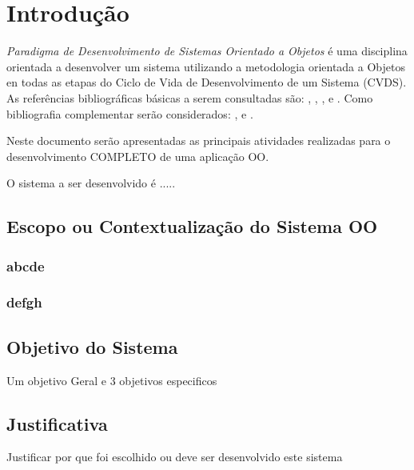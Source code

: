 

\chapter{ Introdu\c{c}\~{a}o}

\textit{Paradigma de Desenvolvimento de Sistemas Orientado a Objetos} \'{e} uma disciplina orientada a desenvolver um sistema utilizando  a metodologia orientada a Objetos en todas as etapas do Ciclo de Vida de Desenvolvimento de um Sistema (CVDS).  As refer\^{e}ncias bibliogr\'{a}ficas b\'{a}sicas a serem consultadas s\~{a}o: \cite{Dennis2014}, \cite{Engholm2013}, \cite{Guedes2011},  \cite{Sommerville2018} e \cite{Wazlawick2011}. Como bibliografia complementar ser\~{a}o considerados: \cite{Satzinger2012}, \cite{Shelly2012} e  \cite{Furgeri2013}.

Neste documento ser\~{a}o apresentadas as principais atividades realizadas para o desenvolvimento COMPLETO de uma aplica\c{c}\~{a}o OO.

O sistema a ser desenvolvido \'{e} .....


   \section{Escopo ou Contextualiza\c{c}\~{a}o do Sistema OO}

        \subsection{abcde}


        \subsection{defgh}

   \section{Objetivo do Sistema}
   Um objetivo Geral e 3 objetivos especificos

   \section{Justificativa}

   Justificar por que foi escolhido ou deve ser desenvolvido este sistema

